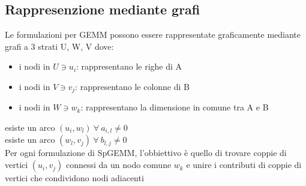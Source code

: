 \subsection{Rappresenzione mediante grafi}
Le formulazioni per GEMM possono essere rappresentate graficamente mediante
grafi a 3 strati U, W, V \parencite{2dNewIdeas,cohen3LayeredGraphs} dove:
\begin{itemize}
  \item i nodi in $U \ni u_i$:   rappresentano le righe di A
  \item i nodi in $V \ni v_j$:   rappresentano le colonne di B
  \item i nodi in $W \ni w_k$:   rappresentano la dimensione in comune tra A e B
\end{itemize}
esiste un arco $(u_i,w_l) ~ \forall ~ a_{i,l} \neq 0$\\
esiste un arco $(w_l,v_j) ~ \forall ~ b_{l,j} \neq 0$\\
Per ogni formulazione di SpGEMM, l'obbiettivo è quello di trovare coppie di
vertici $(u_i,v_j)$ connessi da un nodo comune $w_k$ e unire i
contributi di coppie di vertici che condividono nodi adiacenti\\ %

